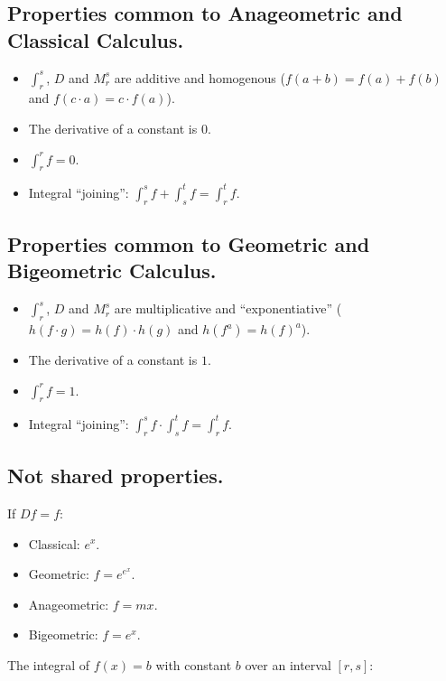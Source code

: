 \newpage

\subsection{Properties common to Anageometric and Classical Calculus.}

\begin{itemize}
	\item $\int_r^s$, $D$ and $M_r^s$ are additive and homogenous ($f(a + b) = f(a) + f(b)$ and $f(c\cdot a) = c\cdot f(a)$).
	\item The derivative of a constant is $0$.
	\item $\int_r^r f = 0$.
	\item Integral \enquote{joining}: $\int_r^s f + \int_s^t f = \int_r^t f$.
\end{itemize}

\subsection{Properties common to Geometric and Bigeometric Calculus.}

\begin{itemize}
	\item $\int_r^s$, $D$ and $M_r^s$ are multiplicative and \enquote{exponentiative} ($h(f\cdot g) = h(f)\cdot h(g)$ and $h(f^a) = h(f)^a$).
	\item The derivative of a constant is $1$.
	\item $\int_r^r f = 1$.
	\item Integral \enquote{joining}: $\int_r^s f \cdot \int_s^t f = \int_r^t f$.
\end{itemize}

\subsection{Not shared properties.}

If $Df = f$:

\begin{itemize}
	\item Classical: $e^x$.
	\item Geometric: $f = e^{e^x}$.
	\item Anageometric: $f = mx$.
	\item Bigeometric: $f = e^x$.
\end{itemize}

The integral of $f(x) = b$ with constant $b$ over an interval $[r, s]$:


